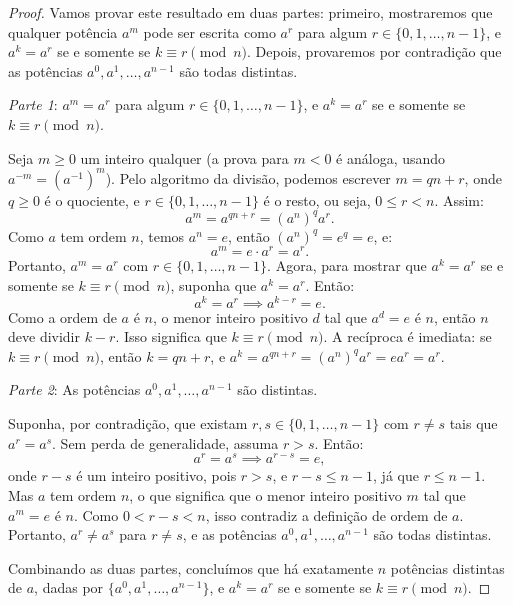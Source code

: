 \begin{proof}
  Vamos provar este resultado em duas partes: primeiro, mostraremos que
  qualquer potência $a^m$ pode ser escrita como $a^r$ para algum $r \in \{0, 1,
  \ldots, n-1\}$, e $a^k = a^r$ se e somente se $k \equiv r \pmod{n}$. Depois,
  provaremos por contradição que as potências $a^0, a^1, \ldots, a^{n-1}$ são
  todas distintas.

  \emph{Parte 1}: $a^m = a^r$ para algum $r \in \{0, 1, \ldots, n-1\}$, e 
  $a^k = a^r$ se e somente se $k \equiv r \pmod{n}$.

  Seja $m \geq 0$ um inteiro qualquer (a prova para $m < 0$ é análoga, usando
  $a^{-m} = (a^{-1})^m$). Pelo algoritmo da divisão, podemos escrever 
  $m = qn + r$, onde $q \geq 0$ é o quociente, e $r \in \{0, 1, \ldots, n-1\}$
  é o resto, ou seja, $0 \leq r < n$. Assim:
  \[
  a^m = a^{qn + r} = (a^n)^q a^r.
  \]
  Como $a$ tem ordem $n$, temos $a^n = e$, então $(a^n)^q = e^q = e$, e:
  \[
  a^m = e \cdot a^r = a^r.
  \]
  Portanto, $a^m = a^r$ com $r \in \{0, 1, \ldots, n-1\}$. Agora, para mostrar
  que $a^k = a^r$ se e somente se $k \equiv r \pmod{n}$, suponha que $a^k = a^r$.
  Então:
  \[
  a^k = a^r \implies a^{k-r} = e.
  \]
  Como a ordem de $a$ é $n$, o menor inteiro positivo $d$ tal que $a^d = e$ é $n$,
  então $n$ deve dividir $k-r$. Isso significa que $k \equiv r \pmod{n}$.
  A recíproca é imediata: se $k \equiv r \pmod{n}$, então $k = qn + r$, e
  $a^k = a^{qn + r} = (a^n)^q a^r = e a^r = a^r$.

  \emph{Parte 2}: As potências $a^0, a^1, \ldots, a^{n-1}$ são distintas. 

  Suponha, por contradição, que existam $r, s \in \{0, 1, \ldots, n-1\}$ com
  $r \neq s$ tais que $a^r = a^s$. Sem perda de generalidade, assuma $r > s$.
  Então:
  \[
  a^r = a^s \implies a^{r-s} = e,
  \]
  onde $r-s$ é um inteiro positivo, pois $r > s$, e $r-s \leq n-1$, já que
  $r \leq n-1$. Mas $a$ tem ordem $n$, o que significa que o menor inteiro
  positivo $m$ tal que $a^m = e$ é $n$. Como $0 < r-s < n$, isso contradiz a
  definição de ordem de $a$. Portanto, $a^r \neq a^s$ para $r \neq s$, e as
  potências $a^0, a^1, \ldots, a^{n-1}$ são todas distintas.

  Combinando as duas partes, concluímos que há exatamente $n$ potências
  distintas de $a$, dadas por $\{ a^0, a^1, \ldots, a^{n-1} \}$, e $a^k = a^r$
  se e somente se $k \equiv r \pmod{n}$.
\end{proof}


